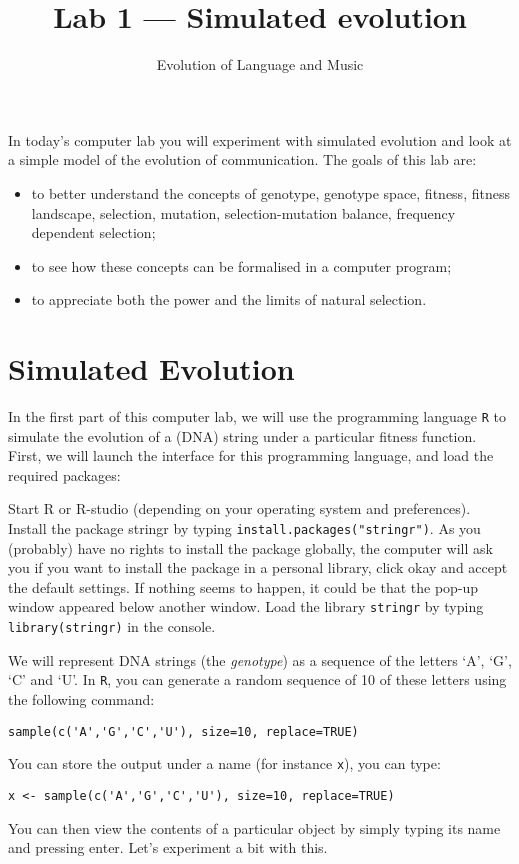\documentclass[a4paper, 9pt]{article}
\title{Lab 1 --- Simulated evolution}
\author{Evolution of Language and Music}
\begin{document}
\maketitle

\begin{goals}
In today's computer lab you will experiment with simulated evolution and
look at a simple model of the evolution of communication. The goals of
this lab are:
\begin{itemize}
\item to better understand the concepts of genotype, genotype space, fitness, fitness landscape, selection, mutation, selection-mutation balance, frequency dependent selection;
\item to see how these concepts can be formalised in a computer program;
\item to appreciate both the power and the limits of natural selection.
\end{itemize}
\end{goals}

\section{Simulated Evolution}\label{simulated-evolution}

In the first part of this computer lab, we will use the programming
language \texttt{R} to simulate the evolution of a (DNA) string under a
particular fitness function. First, we will launch the interface for
this programming language, and load the required packages:

\begin{exercise}
    \action Start R or R-studio (depending on your operating system and preferences).
    \action Install the package stringr by typing \verb|install.packages("stringr")|. As you (probably) have no rights to install the package globally, the computer will ask you if you want to install the package in a personal library, click okay and accept the default settings. If nothing seems to happen, it could be that the pop-up window appeared below another window.
    \action Load the library \texttt{stringr} by typing \texttt{library(stringr)} in the console.
\end{exercise}


We will represent DNA strings (the \textit{genotype}) as a sequence of
the letters `A', `G', `C' and `U'. In \texttt{R}, you can generate a
random sequence of 10 of these letters using the following command:

\begin{lstlisting}
sample(c('A','G','C','U'), size=10, replace=TRUE)
\end{lstlisting}
You can store the output under a name (for instance \texttt{x}), you can
type:
\begin{lstlisting}
x <- sample(c('A','G','C','U'), size=10, replace=TRUE)
\end{lstlisting}
You can then view the contents of a particular object by simply typing
its name and pressing enter. Let's experiment a bit with this.
\end{document}
